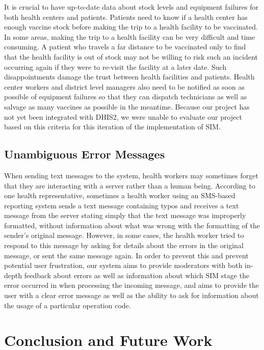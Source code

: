 \documentclass{acm_proc_article-sp}
\begin{document}
It is crucial to have up-to-date data about stock levels and equipment failures for both health centers and patients. Patients need to know if a health center has enough vaccine stock before making the trip to a health facility to be vaccinated. In some areas, making the trip to a health facility can be very difficult and time consuming. A patient who travels a far distance to be vaccinated only to find that the health facility is out of stock may not be willing to risk such an incident occurring again if they were to re-visit the facility at a later date. Such disappointments damage the trust between health facilities and patients. Health center workers and district level managers also need to be notified as soon as possible of equipment failures so that they can dispatch technicians as well as salvage as many vaccines as possible in the meantime. Because our project has not yet been integrated with DHIS2, we were unable to evaluate our project based on this criteria for this iteration of the implementation of SIM.

\subsection{Unambiguous Error Messages}

When sending text messages to the system, health workers may sometimes forget that they are interacting with a server rather than a human being. According to one health representative, sometimes a health worker using an SMS-based reporting system sends a text message containing typos and receives a text message from the server stating simply that the text message was improperly formatted, without information about what was wrong with the formatting of the sender's original message. However, in some cases, the health worker tried to respond to this message by asking for details about the errors in the original message, or sent the same message again. In order to prevent this and prevent potential user frustration, our system aims to provide moderators with both in-depth feedback about errors as well as information about which SIM stage the error occurred in when processing the incoming message, and aims to provide the user with a clear error message as well as the ability to ask for information about the usage of a particular operation code.

\section{Conclusion and Future Work}
\end{document}
